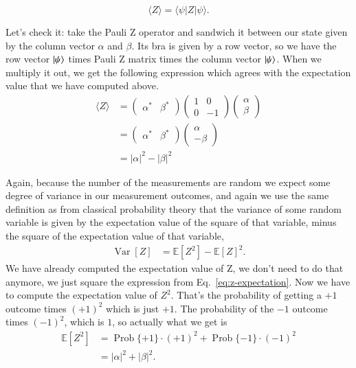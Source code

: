 \begin{equation}
\langle Z\rangle=\langle\psi|Z| \psi\rangle.
\end{equation}

Let's check it: take the Pauli Z operator and sandwich it between our state given by the column vector $\alpha$ and $\beta$. Its bra is given by a row vector, so we have the row vector $\left| \psi \right\rangle$ times Pauli Z matrix times the column vector $\left| \psi \right\rangle$. When we multiply it out, we get the following expression which agrees with the expectation value that we have computed above.
\begin{equation}
\begin{aligned}
\langle Z\rangle &=\left(\begin{array}{ll}
\alpha^{*} & \beta^{*}
\end{array}\right)\left(\begin{array}{cc}
1 & 0 \\
0 & -1
\end{array}\right)\left(\begin{array}{l}
\alpha \\
\beta
\end{array}\right) \\
&=\left(\begin{array}{ll}
\alpha^{*} & \beta^{*}
\end{array}\right)\left(\begin{array}{c}
\alpha \\
-\beta
\end{array}\right) \\
&=|\alpha|^{2}-|\beta|^{2}
\end{aligned}
\label{eq:z-expectation}
\end{equation}

Again, because the number of the measurements are random we expect some degree of variance in our measurement outcomes, and again we use the same definition as from classical probability theory that the variance of some random variable is given by the expectation value of the square of that variable, minus the square of the expectation value of that variable,
\begin{equation}
\begin{aligned}
\operatorname{Var}[Z] &=\mathbb{E}\left[Z^{2}\right]-\mathbb{E}[Z]^{2}.    
\end{aligned}
\end{equation}
We have already computed the expectation value of Z, we don't need to do that anymore, we just square the expression from Eq.~\ref{eq:z-expectation}. Now we have to compute the expectation value of $Z^2$. That's the probability of getting a $+1$ outcome times $(+1)^2$ which is just $+1$.  The probability of the $-1$ outcome times $(-1)^2$, which is $1$, so actually what we get is
\begin{equation}
\begin{aligned}
\mathbb{E}\left[Z^{2}\right] &=\operatorname{Prob}\{+1\} \cdot(+1)^{2}+\operatorname{Prob}\{-1\} \cdot(-1)^{2} \\
&=|\alpha|^{2}+|\beta|^{2}.
\end{aligned}
\end{equation}


